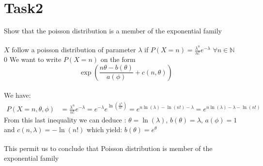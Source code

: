 \documentclass[11pt,a4paper]{article}
\begin{document}
\section*{Task2}

Show that the poisson distribution is a member of the exponential family\\
\\$X$ follow a poisson distribution of parameter $\lambda$ if $P(X = n)= \frac{\lambda^{n}}{n!}e^{-\lambda}$ $\forall n \in\mathbb{N}$\\0
  We want to write $P(X=n)$ on the form $$\displaystyle \exp(\frac{n\theta-b(\theta)}{a(\phi)}+c(n,\theta))$$\\
We  have:
\begin{align*}
	P(X = n, \theta,\phi )& = \frac{\lambda^{n}}{n!}e^{-\lambda}
	=e^{-\lambda}e^{\ln(\frac{\lambda^{n}}{n!})}
	=e^{n\ln(\lambda)-\ln(n!)-\lambda}
	=e^{n\ln(\lambda)-\lambda-\ln(n!)}
	\end{align*}
From this last inequality we can deduce : $\theta=\ln(\lambda)$, $b(\theta)=\lambda$, $a(\phi)=1$ and $c(n,\lambda)=-\ln(n!)$ which yield:   $b(\theta)=e^{\theta}$\\
\\This permit us to conclude that Poisson distribution is member of the exponential family
\end{document}
